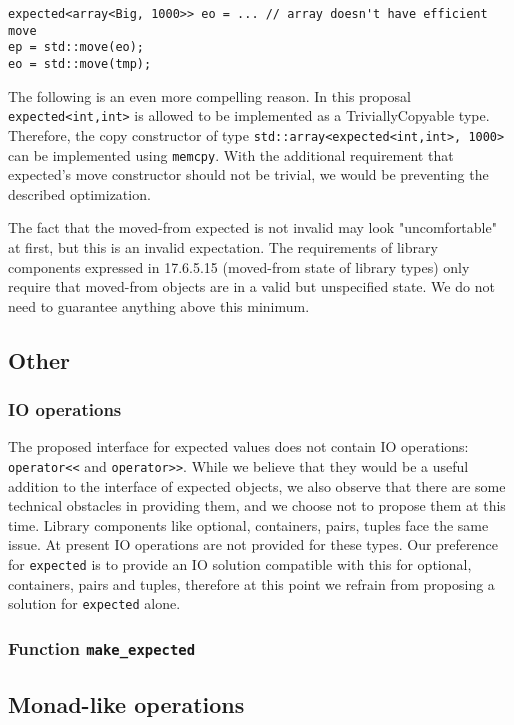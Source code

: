 \documentclass[a4paper,10pt]{article}
\newcommand{\cpp}[1]{\lstinline{#1}}
\begin{document}
\begin{lstlisting}
expected<array<Big, 1000>> eo = ... // array doesn't have efficient move
ep = std::move(eo);
eo = std::move(tmp);
\end{lstlisting}

The following is an even more compelling reason. In this proposal \cpp{expected<int,int>} is allowed to be implemented as a TriviallyCopyable type. Therefore, the copy constructor of type \cpp{std::array<expected<int,int>, 1000>} can be implemented using \cpp{memcpy}. With the additional requirement that expected's move constructor should not be trivial, we would be preventing the described optimization.

The fact that the moved-from expected is not invalid may look "uncomfortable" at first, but this is an invalid expectation. The requirements of library components expressed in 17.6.5.15 (moved-from state of library types) only require that moved-from objects are in a valid but unspecified state. We do not need to guarantee anything above this minimum.

\subsection{Other}

\subsubsection{IO operations}

The proposed interface for expected values does not contain IO operations: \cpp{operator<<} and \cpp{operator>>}. While we believe that they would be a useful addition to the interface of expected objects, we also observe that there are some technical obstacles in providing them, and we choose not to propose them at this time. Library components like optional, containers, pairs, tuples face the same issue. At present IO operations are not provided for these types. Our preference for \cpp{expected} is to provide an IO solution compatible with this for optional, containers, pairs and tuples, therefore at this point we refrain from proposing a solution for \cpp{expected} alone.


\subsubsection{Function \cpp{make_expected}}

\subsection{Monad-like operations}
\end{document}
